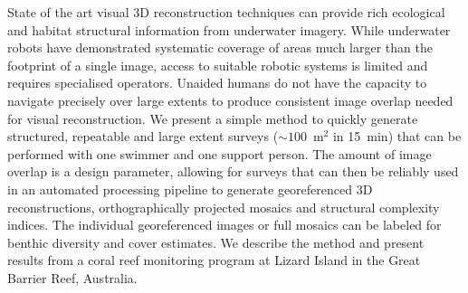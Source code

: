 
State of the art visual 3D reconstruction techniques can provide rich ecological and habitat structural information from underwater imagery. While underwater robots have demonstrated systematic coverage of areas much larger than the footprint of a single image, access to suitable robotic systems is limited and requires specialised operators. Unaided humans do not have the capacity to navigate precisely over large extents to produce consistent image overlap needed for visual reconstruction. We present a simple method to quickly generate structured, repeatable and large extent surveys ($\sim{100}$~m$^{2}$ in 15~min) that can be performed with one swimmer and one support person. The amount of image overlap is a design parameter, allowing for surveys that can then be reliably used in an automated processing pipeline to generate georeferenced 3D reconstructions, orthographically projected mosaics and structural complexity indices. The individual georeferenced images or full mosaics can be labeled for benthic diversity and cover estimates. We describe the method and present results from a coral reef monitoring program at Lizard Island in the Great Barrier Reef, Australia.
  
  